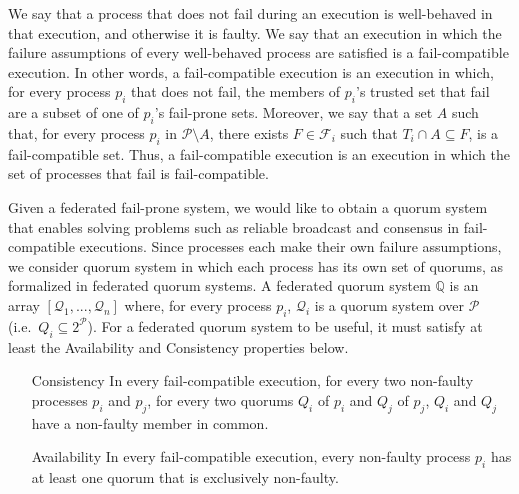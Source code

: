 \documentclass[11pt,letterpaper]{article}
\begin{document}
We say that a process that does not fail during an execution is well-behaved in that execution, and otherwise it is faulty.
We say that an execution in which the failure assumptions of every well-behaved process are satisfied is a fail-compatible execution.
In other words, a fail-compatible execution is an execution in which, for every process $p_i$ that does not fail, the members of $p_i$'s trusted set that fail are a subset of one of $p_i$'s fail-prone sets.
Moreover, we say that a set $A$ such that, for every process $p_i$ in $\mathcal{P}\setminus A$, there exists $F\in\mathcal{F}_i$ such that $T_i\cap A \subseteq F$, is a fail-compatible set.
Thus, a fail-compatible execution is an execution in which the set of processes that fail is fail-compatible.

Given a federated fail-prone system, we would like to obtain a quorum system that enables solving problems such as reliable broadcast and consensus in fail-compatible executions.
Since processes each make their own failure assumptions, we consider quorum system in which each process has its own set of quorums, as formalized in federated quorum systems.
A federated quorum system $\mathbb{Q}$ is an array $\left[\mathcal{Q}_1,...,\mathcal{Q}_n\right]$ where, for every process $p_i$, $\mathcal{Q}_i$ is a quorum system over $\mathcal{P}$ (i.e.\ $Q_i\subseteq 2^{\mathcal{P}}$).
For a federated quorum system to be useful, it must satisfy at least the Availability and Consistency properties below.
\begin{itemize}
  \item[Consistency] In every fail-compatible execution, for every two non-faulty processes $p_i$ and $p_j$, for every two quorums $Q_i$ of $p_i$ and $Q_j$ of $p_j$, $Q_i$ and $Q_j$ have a non-faulty member in common.
  \item[Availability] In every fail-compatible execution, every non-faulty process $p_i$  has at least one quorum that is exclusively non-faulty.
\end{itemize}
\end{document}
